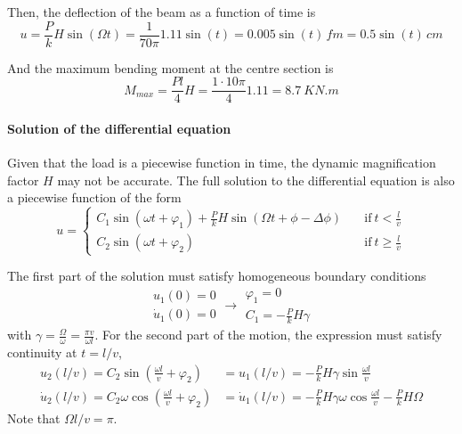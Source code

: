 \begin{Answer}[ref={moving_load}]
Then, the deflection of the beam as a function of time is
$$
u = \frac{P}{k}H\sin(\Omega t) = \frac{1}{70\pi}1.11\sin(t) = 0.005\sin(t)\,f\si{m} = 0.5\sin(t)\,\si{cm}
$$

And the maximum bending moment at the centre section is
$$
M_{max} = \frac{Pl}{4}H = \frac{1 \cdot 10\pi}{4}1.11 = \SI{8.7}{KN.m}
$$

\paragraph{Solution of the differential equation}
Given that the load is a piecewise function in time, the dynamic magnification factor $H$ may not be accurate. The full solution to the differential equation is also a piecewise function of the form
$$
u =
\begin{cases}
C_1\sin(\omega t + \varphi_1) + \frac{P}{k}H\sin(\Omega t + \phi - \Delta\phi) \quad &\text{if}\ t < \frac{l}{v} \\
C_2\sin(\omega t + \varphi_2) \quad &\text{if}\ t \geq \frac{l}{v}
\end{cases}
$$

The first part of the solution must satisfy homogeneous boundary conditions
$$
\begin{array}{l}
u_1(0) = 0 \\
\dot{u}_1(0) = 0
\end{array} \rightarrow
\begin{array}{l}
\varphi_1 = 0 \\
C_1 = -\frac{P}{k}H\gamma
\end{array}
$$
with $\gamma = \frac{\Omega}{\omega} = \frac{\pi v}{\omega l}$. For the second part of the motion, the expression must satisfy continuity at $t = l/v$,
\begin{align*}
u_2(l/v) = C_2\sin\left(\frac{\omega l}{v}+\varphi_2\right) &= u_1(l/v) = -\frac{P}{k}H\gamma\sin\frac{\omega l}{v} \\
\dot{u}_2(l/v) = C_2\omega\cos\left(\frac{\omega l}{v}+\varphi_2\right) &= \dot{u}_1(l/v) = -\frac{P}{k}H\gamma\omega\cos\frac{\omega l}{v} - \frac{P}{k}H\Omega
\end{align*}
Note that $\Omega l/v = \pi$.


\end{Answer}
